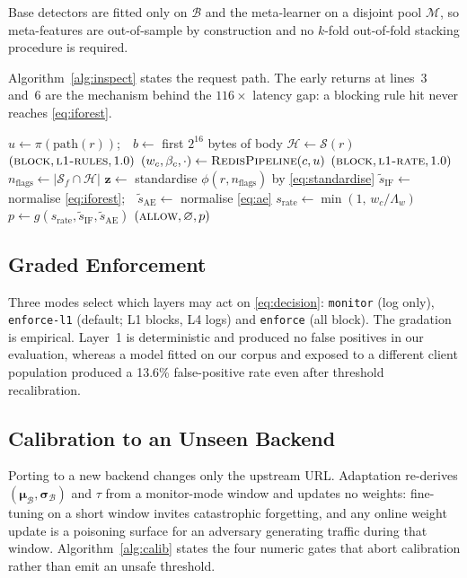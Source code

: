 \documentclass[conference]{IEEEtran}
\begin{document}
Base detectors are fitted only on $\mathcal{B}$ and the meta-learner on a disjoint pool
$\mathcal{M}$, so meta-features are out-of-sample by construction and no $k$-fold out-of-fold
stacking procedure is required.

Algorithm~\ref{alg:inspect} states the request path. The early returns at lines~3 and~6 are
the mechanism behind the $116\times$ latency gap: a blocking rule hit never reaches
\eqref{eq:iforest}.

\begin{algorithm}[H]
\SetAlgoLined
{}
$u \leftarrow \pi(\textrm{path}(r))$;\ \ $b \leftarrow$ first $2^{16}$ bytes of body
$\mathcal{H} \leftarrow \mathcal{S}(r)$ 
  {\Return $(\textsc{block},\textsc{l1-rules},1.0)$}
$(w_c,\beta_c,\cdot) \leftarrow \textsc{RedisPipeline}(c,u)$ 
  {\Return $(\textsc{block},\textsc{l1-rate},1.0)$}
$n_{\text{flags}} \leftarrow |\mathcal{S}_f\cap\mathcal{H}|$\;
$\mathbf{z} \leftarrow$ standardise $\phi(r,n_{\text{flags}})$ by \eqref{eq:standardise}\;
$\tilde{s}_{\text{IF}} \leftarrow$ normalise \eqref{eq:iforest};\ \
$\tilde{s}_{\text{AE}} \leftarrow$ normalise \eqref{eq:ae}\;
$s_{\text{rate}} \leftarrow \min(1,\,w_c/\Lambda_w)$\;
$p \leftarrow g(s_{\text{rate}},\tilde{s}_{\text{IF}},\tilde{s}_{\text{AE}})$\;
\lIf{$p \ge \tau$}{\Return $(\textsc{block},\textsc{l4-meta},p)$}
\Return $(\textsc{allow},\varnothing,p)$\;
\caption{Request-time inspection}
\label{alg:inspect}
\end{algorithm}

\subsection{Graded Enforcement}
Three modes select which layers may act on \eqref{eq:decision}: \texttt{monitor} (log only),
\texttt{enforce-l1} (default; L1 blocks, L4 logs) and \texttt{enforce} (all block). The
gradation is empirical. Layer~1 is deterministic and produced no false positives in our
evaluation, whereas a model fitted on our corpus and exposed to a different client population
produced a 13.6\% false-positive rate even after threshold recalibration.

\subsection{Calibration to an Unseen Backend}
Porting to a new backend changes only the upstream URL. Adaptation re-derives
$(\boldsymbol{\mu}_{\mathcal{B}},\boldsymbol{\sigma}_{\mathcal{B}})$ and $\tau$ from a
monitor-mode window and updates no weights: fine-tuning on a short window invites catastrophic
forgetting, and any online weight update is a poisoning surface for an adversary generating
traffic during that window. Algorithm~\ref{alg:calib} states the four numeric gates that abort
calibration rather than emit an unsafe threshold.
\end{document}
